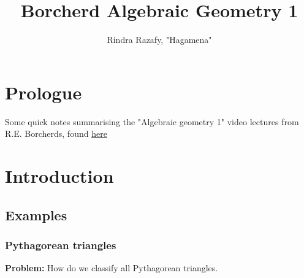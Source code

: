 
\author{Rindra Razafy, "Hagamena"}
\title{Borcherd Algebraic Geometry 1}
\setcounter{section}{-1}


\maketitle
\tableofcontents

\newpage

\section{Prologue}
Some quick notes summarising the "Algebraic geometry 1" video lectures from R.E. Borcherds, found \href{https://youtube.com/playlist?list=PL8yHsr3EFj53j51FG6wCbQKjBgpjKa5PX}{here} 

\newpage

\section{Introduction}
\subsection{Examples}
\subsubsection{Pythagorean triangles}
\textbf{Problem:} How do we classify all Pythagorean triangles.

